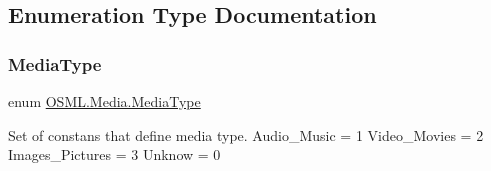 \subsection{Enumeration Type Documentation}
\mbox{\label{namespaceOSML_1_1Media_aa3e4261aa5181fcc93920ffe409e8b02}} 
\subsubsection{\texorpdfstring{MediaType}{MediaType}}
{\footnotesize\ttfamily enum \mbox{\hyperlink{namespaceOSML_1_1Media_aa3e4261aa5181fcc93920ffe409e8b02}{O\+S\+M\+L.\+Media.\+Media\+Type}}\hspace{0.3cm}{\ttfamily [strong]}}



Set of constans that define media type. Audio\+\_\+\+Music = 1 Video\+\_\+\+Movies = 2 Images\+\_\+\+Pictures = 3 Unknow = 0 

